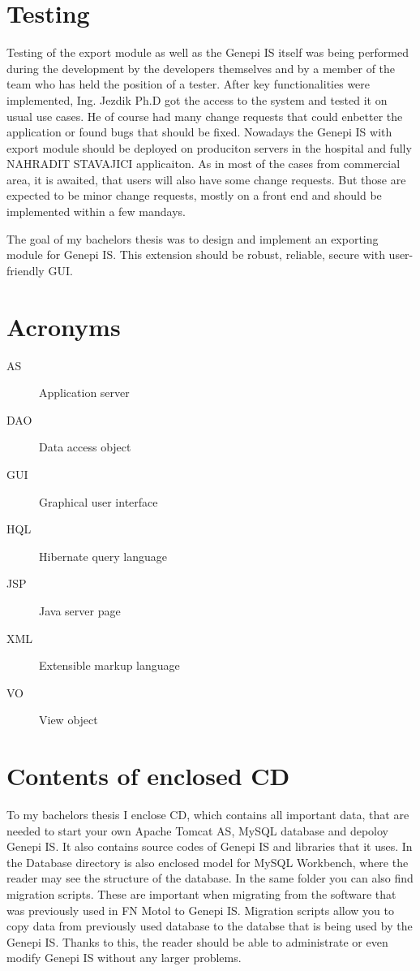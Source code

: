 \documentclass[thesis=B,english]{FITthesis}[2012/10/20]
\begin{document}
\chapter{Testing}
Testing of the export module as well as the Genepi IS itself was being performed during the development by the developers themselves and by a member of the team who has held the position of a tester. After key  functionalities were implemented, Ing. Jezdik Ph.D got the access to the system and tested it on usual use cases. He of course had many change requests that could enbetter the application or found bugs that should be fixed. Nowadays the Genepi IS with export module should be deployed on produciton servers in the hospital and fully NAHRADIT STAVAJICI applicaiton. As in most of the cases from commercial area, it is awaited, that users will also have some change requests. But those are expected to be minor change requests, mostly on a front end and should be implemented within a few mandays.
\begin{conclusion}
The goal of my bachelors thesis was to design and implement an exporting module for Genepi IS. This extension should be robust, reliable, secure with user-friendly GUI. 
\end{conclusion}




\appendix

\chapter{Acronyms}
\begin{description}
	\item[AS] Application server
	\item[DAO] Data access object
	\item[GUI] Graphical user interface
	\item[HQL] Hibernate query language
	\item[JSP] Java server page
	\item[XML] Extensible markup language
	\item[VO] View object
\end{description}




\chapter{Contents of enclosed CD}
To my bachelors thesis I enclose CD, which contains all important data, that are needed to start your own Apache Tomcat AS, MySQL database and depoloy Genepi IS. It also contains source codes of Genepi IS and libraries that it uses. In the Database directory is also enclosed model for MySQL Workbench, where the reader may see the structure of the database. In the same folder you can also find migration scripts. These are important when migrating from the software that was previously used in FN Motol to Genepi IS. Migration scripts allow you to copy data from previously used database to the databse that is being used by the Genepi IS.
Thanks to this, the reader should be able to administrate or even modify Genepi IS without any larger problems.
\end{document}
